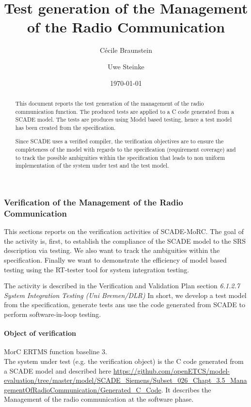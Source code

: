 \documentclass{article}
\title{Test generation of the Management of the Radio Communication}
\author{Cécile Braunstein \and Uwe Steinke}
\date{\today}
\newcommand{\nl}{\mbox{}\\}
\begin{document}
\maketitle
\begin{abstract}
This document reports  the test generation of the management of the
radio communication function. The produced tests are applied to a C
code generated from a SCADE model. The tests are produces using Model
based testing, hence a test model has been  created from the
specification.

Since SCADE uses a verified compiler, the verification objectives are
to ensure the completeness of the model with regards to the
specification (requirement coverage) and to track the possible
ambiguities within the specification that leads to non uniform
implementation of the system under test and the test model.
\end{abstract}


\subsubsection{Verification of the  Management of the Radio Communication}

This sections reports on the verification activities of
SCADE-MoRC. The goal of the activity is, first, to establish the compliance of
the SCADE model to the SRS description via testing. We also want to track the
ambiguities within the specification. Finally we want to demonstrate
the efficiency of model based testing using the RT-tester tool for
system integration testing.

The activity is described in the Verification and Validation Plan
section {\em 6.1.2.7 System Integration Testing (Uni Bremen/DLR)} \cite{D4.1_2013}
In short, we develop a test model from the specification, generate tests ans use
the code generated from SCADE to perform software-in-loop testing.

\paragraph{Object of verification}
 MorC ERTMS function baseline 3.
\nl


The system under test (e.g. the verification object) is the C code
generated from a SCADE model and described here
\url{https://github.com/openETCS/model-evaluation/tree/master/model/SCADE_Siemens/Subset_026_Chapt_3.5_ManagementOfRadioCommunication/Generated_C_Code}.
It describes the Management of the radio communication at the software
phase.
\end{document}
